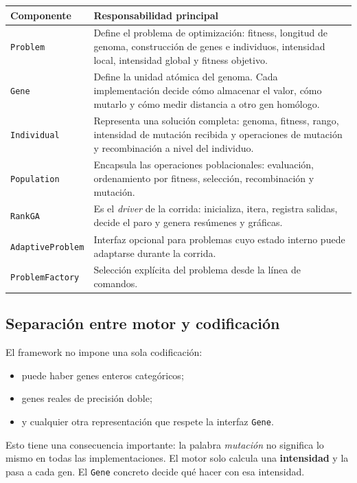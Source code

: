 \documentclass[11pt]{article}
\begin{document}
\begin{longtable}{|p{3cm}|p{10cm}|}
\hline
\textbf{Componente} & \textbf{Responsabilidad principal} \\
\hline
\texttt{Problem} & Define el problema de optimizaci\'on: fitness, longitud de
genoma, construcci\'on de genes e individuos, intensidad local, intensidad
global y fitness objetivo. \\
\hline
\texttt{Gene} & Define la unidad at\'omica del genoma. Cada implementaci\'on
decide c\'omo almacenar el valor, c\'omo mutarlo y c\'omo medir distancia a
otro gen hom\'ologo. \\
\hline
\texttt{Individual} & Representa una soluci\'on completa: genoma, fitness,
rango, intensidad de mutaci\'on recibida y operaciones de mutaci\'on y
recombinaci\'on a nivel del individuo. \\
\hline
\texttt{Population} & Encapsula las operaciones poblacionales: evaluaci\'on,
ordenamiento por fitness, selecci\'on, recombinaci\'on y mutaci\'on. \\
\hline
\texttt{RankGA} & Es el \emph{driver} de la corrida: inicializa, itera,
registra salidas, decide el paro y genera res\'umenes y gr\'aficas. \\
\hline
\texttt{AdaptiveProblem} & Interfaz opcional para problemas cuyo estado interno
puede adaptarse durante la corrida. \\
\hline
\texttt{ProblemFactory} & Selecci\'on expl\'icita del problema desde la l\'inea
de comandos. \\
\hline
\end{longtable}

\subsection{Separaci\'on entre motor y codificaci\'on}

El framework no impone una sola codificaci\'on:

\begin{itemize}
  \item puede haber genes enteros categ\'oricos;
  \item genes reales de precisi\'on doble;
  \item y cualquier otra representaci\'on que respete la interfaz
  \texttt{Gene}.
\end{itemize}

Esto tiene una consecuencia importante: la palabra \emph{mutaci\'on} no
significa lo mismo en todas las implementaciones. El motor solo calcula una
\textbf{intensidad} y la pasa a cada gen. El \texttt{Gene} concreto decide qu\'e
hacer con esa intensidad.
\end{document}
